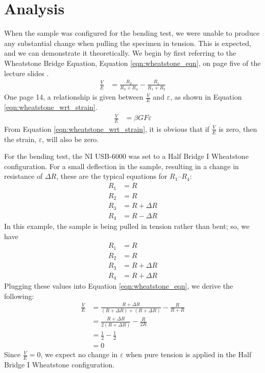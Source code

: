 \documentclass[12 pt]{report}
\begin{document}
\section{Analysis} \label{sec:analysis}
\begin{parlist}
	\item When the sample was configured for the bending test, we were unable to produce any substantial change when pulling the specimen in tension. This is expected, and we can demonstrate it theoretically. We begin by first referring to the Wheatstone Bridge Equation, Equation \ref{eqn:wheatstone_eqn}, on page five of the lecture slides \cite{slides}.
	\begin{align} \label{eqn:wheatstone_eqn}
		\frac{V}{E}&=\frac{R_3}{R_3+R_4	}-\frac{R_1}{R_1+R_2}
	\end{align}
	One page \num{14}, a relationship is given between $\frac{V}{E}$ and $\varepsilon$, as shown in Equation \ref{eqn:wheatstone_wrt_strain}.
	\begin{align} \label{eqn:wheatstone_wrt_strain}
		\frac{V}{E}&=\beta{}GF\varepsilon
	\end{align}
	From Equation \ref{eqn:wheatstone_wrt_strain}, it is obvious that if $\frac{V}{E}$ is zero, then the strain, $\varepsilon$, will also be zero.
	
	For the bending test, the NI USB-6000 was set to a Half Bridge I Wheatstone configuration. For a small deflection in the sample, resulting in a change in resistance of $\Delta{}R$, these are the typical equations for $R_1$--$R_4$:
	\begin{align*}
		R_1&=R\\
		R_2&=R\\
		R_3&=R+{\Delta}R\\
		R_4&=R-{\Delta}R
	\end{align*}
	In this example, the sample is being pulled in tension rather than bent; so, we have
	\begin{align*}
		R_1&=R\\
		R_2&=R\\
		R_3&=R+\Delta{}R\\
		R_4&=R+\Delta{}R
	\end{align*}
	Plugging these values into Equation \ref{eqn:wheatstone_eqn}, we derive the following:
	\begin{align*}
		\frac{V}{E}&=\frac{R+\Delta{}R}{(R+\Delta{}R)+(R+\Delta{}R)}-\frac{R}{R+R}\\
		&=\frac{R+\Delta{}R}{2(R+\Delta{}R)}-\frac{R}{2R}\\
		&=\frac{1}{2}-\frac{1}{2}\\
		&=0
	\end{align*}
	Since $\frac{V}{E}=0$, we expect no change in $\varepsilon$ when pure tension is applied in the Half Bridge I Wheatstone configuration.
	

\end{parlist}
\end{document}
